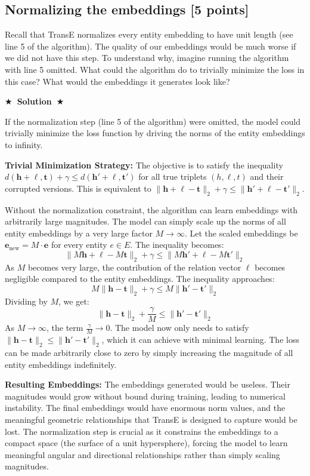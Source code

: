 \documentclass{article}
\numberwithin{figure}{section}
\newcommand{\Solution}[1]{%
    {%
        \medskip
        \color{red}
        \bf $\bigstar$~\sf\textbf{Solution}~$\bigstar$ \sf
        #1
    }
    \bigskip
}
\begin{document}
\subsection{ Normalizing the embeddings [5 points]}
Recall that TransE normalizes every entity embedding to have unit length (see line 5 of the algorithm). The quality of our embeddings would be much worse if we did not have this step. To understand why, imagine running the algorithm with line 5 omitted.
What could the algorithm do to trivially minimize the loss in this case? What would the embeddings
it generates look like?

\Solution{
	If the normalization step (line 5 of the algorithm) were omitted, the model could trivially minimize the loss function by driving the norms of the entity embeddings to infinity.
	
	\textbf{Trivial Minimization Strategy:}
	The objective is to satisfy the inequality $d(\mathbf{h}+\boldsymbol{\ell}, \mathbf{t}) + \gamma \leq d(\mathbf{h'}+\boldsymbol{\ell}, \mathbf{t'})$ for all true triplets $(h, \ell, t)$ and their corrupted versions. This is equivalent to $\|\mathbf{h}+\boldsymbol{\ell}-\mathbf{t}\|_2 + \gamma \leq \|\mathbf{h'}+\boldsymbol{\ell}-\mathbf{t'}\|_2$.
	
	Without the normalization constraint, the algorithm can learn embeddings with arbitrarily large magnitudes. The model can simply scale up the norms of all entity embeddings by a very large factor $M \rightarrow \infty$.
	Let the scaled embeddings be $\mathbf{e}_{\text{new}} = M \cdot \mathbf{e}$ for every entity $e \in E$. The inequality becomes:
	\[ \|M\mathbf{h}+\boldsymbol{\ell}-M\mathbf{t}\|_2 + \gamma \leq \|M\mathbf{h'}+\boldsymbol{\ell}-M\mathbf{t'}\|_2 \]
	As $M$ becomes very large, the contribution of the relation vector $\boldsymbol{\ell}$ becomes negligible compared to the entity embeddings. The inequality approaches:
	\[ M\|\mathbf{h}-\mathbf{t}\|_2 + \gamma \leq M\|\mathbf{h'}-\mathbf{t'}\|_2 \]
	Dividing by $M$, we get:
	\[ \|\mathbf{h}-\mathbf{t}\|_2 + \frac{\gamma}{M} \leq \|\mathbf{h'}-\mathbf{t'}\|_2 \]
	As $M \rightarrow \infty$, the term $\frac{\gamma}{M} \rightarrow 0$. The model now only needs to satisfy $\|\mathbf{h}-\mathbf{t}\|_2 \leq \|\mathbf{h'}-\mathbf{t'}\|_2$, which it can achieve with minimal learning. The loss can be made arbitrarily close to zero by simply increasing the magnitude of all entity embeddings indefinitely.
	
	\textbf{Resulting Embeddings:}
	The embeddings generated would be useless. Their magnitudes would grow without bound during training, leading to numerical instability. The final embeddings would have enormous norm values, and the meaningful geometric relationships that TransE is designed to capture would be lost. The normalization step is crucial as it constrains the embeddings to a compact space (the surface of a unit hypersphere), forcing the model to learn meaningful angular and directional relationships rather than simply scaling magnitudes.
}
\end{document}
